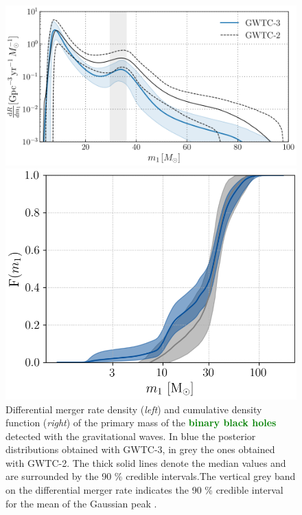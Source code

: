 \documentclass[a4paper,titlepage]{book}     	%
\newcommand{\erika}[1]{\textcolor{green}{\bf#1}}
\begin{document}
\begin{figure}
	\begin{minipage}{.60\textwidth}
		\centering
		\includegraphics[width=\textwidth]{./images/MassMergerRate.png}
	\end{minipage}
	\hfill
	\begin{minipage}{.39\textwidth}
		\vspace{1mm}
		\centering
		\includegraphics[width=\textwidth]{./images/MassCumulative.png}	
	\end{minipage}
	\caption{Differential merger rate density  (\emph{left}) and cumulative density function (\emph{right}) of the primary mass of the \erika{binary black holes} detected with the gravitational waves. In blue the posterior distributions obtained with GWTC-3, in grey the ones obtained with GWTC-2. The thick solid lines denote the median values and are surrounded by the 90 \% credible intervals.The vertical grey band on the differential merger rate indicates the 90 \% credible interval for the mean of the Gaussian peak \cite{GWTC-3_interpretation}.}\label{fig:primarymassspectrum}
\end{figure}
\end{document}
